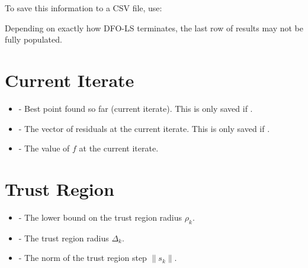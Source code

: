 \documentclass[letterpaper,10pt,english]{sphinxmanual}
\begin{document}
To save this information to a CSV file, use:
\begin{quote}

\begin{sphinxVerbatim}[commandchars=\\\{\}]

   

    

\end{sphinxVerbatim}
\end{quote}

Depending on exactly how DFO-LS terminates, the last row of results may not be fully populated.


\section{Current Iterate}
\label{\detokenize{diagnostic:current-iterate}}\begin{itemize}
\item {} 
 - Best point found so far (current iterate). This is only saved if .

\item {} 
 - The vector of residuals at the current iterate. This is only saved if .

\item {} 
 - The value of \(f\) at the current iterate.

\end{itemize}


\section{Trust Region}
\label{\detokenize{diagnostic:trust-region}}\begin{itemize}
\item {} 
 - The lower bound on the trust region radius \(\rho_k\).

\item {} 
 - The trust region radius \(\Delta_k\).

\item {} 
 - The norm of the trust region step \(\|s_k\|\).

\end{itemize}
\end{document}
